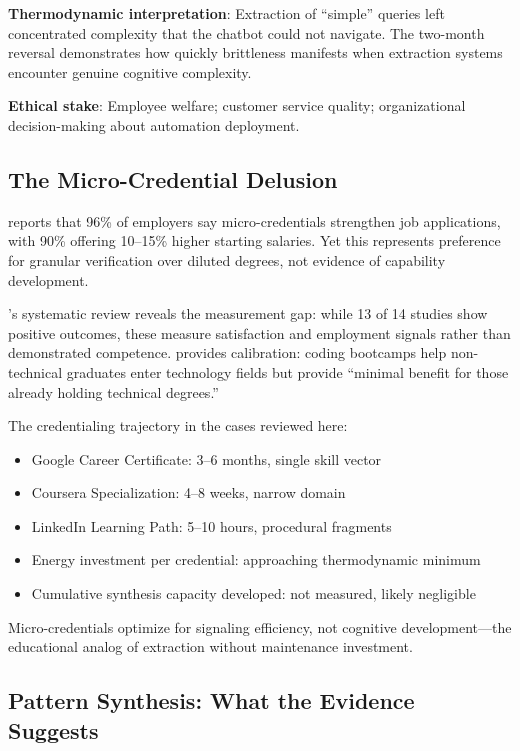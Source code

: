 \textbf{Thermodynamic interpretation}: Extraction of ``simple'' queries left concentrated complexity that the chatbot could not navigate. The two-month reversal demonstrates how quickly brittleness manifests when extraction systems encounter genuine cognitive complexity.

\textbf{Ethical stake}: Employee welfare; customer service quality; organizational decision-making about automation deployment.

\subsection{The Micro-Credential Delusion}

\citet{lumina2025} reports that 96\% of employers say micro-credentials strengthen job applications, with 90\% offering 10--15\% higher starting salaries. Yet this represents preference for granular verification over diluted degrees, not evidence of capability development.

\citet{ha2022}'s systematic review reveals the measurement gap: while 13 of 14 studies show positive outcomes, these measure satisfaction and employment signals rather than demonstrated competence. \citet{joshi2019} provides calibration: coding bootcamps help non-technical graduates enter technology fields but provide ``minimal benefit for those already holding technical degrees.''

The credentialing trajectory in the cases reviewed here:

\begin{itemize}
\item Google Career Certificate: 3--6 months, single skill vector
\item Coursera Specialization: 4--8 weeks, narrow domain
\item LinkedIn Learning Path: 5--10 hours, procedural fragments
\item Energy investment per credential: approaching thermodynamic minimum
\item Cumulative synthesis capacity developed: not measured, likely negligible
\end{itemize}

Micro-credentials optimize for signaling efficiency, not cognitive development---the educational analog of extraction without maintenance investment.

\subsection{Pattern Synthesis: What the Evidence Suggests}

